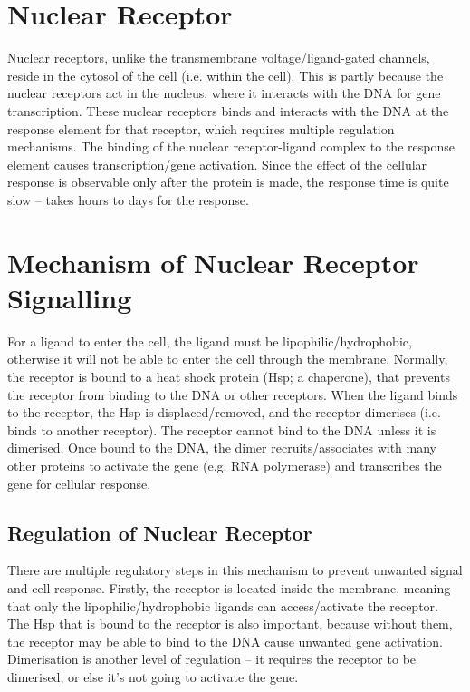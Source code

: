 \section{Nuclear Receptor}

Nuclear receptors, unlike the transmembrane voltage/ligand-gated channels, reside in the cytosol of the cell (i.e. within the cell).
This is partly because the nuclear receptors act in the nucleus, where it interacts with the DNA for gene transcription.
These nuclear receptors binds and interacts with the DNA at the response element for that receptor, which requires multiple regulation mechanisms.
The binding of the nuclear receptor-ligand complex to the response element causes transcription/gene activation.
Since the effect of the cellular response is observable only after the protein is made, the response time is quite slow -- takes hours to days for the response.

\section{Mechanism of Nuclear Receptor Signalling}

For a ligand to enter the cell, the ligand must be lipophilic/hydrophobic, otherwise it will not be able to enter the cell through the membrane.
Normally, the receptor is bound to a heat shock protein (Hsp; a chaperone), that prevents the receptor from binding to the DNA or other receptors.
When the ligand binds to the receptor, the Hsp is displaced/removed, and the receptor dimerises (i.e. binds to another receptor).
The receptor cannot bind to the DNA unless it is dimerised.
Once bound to the DNA, the dimer recruits/associates with many other proteins to activate the gene (e.g. RNA polymerase) and transcribes the gene for cellular response.

\subsection{Regulation of Nuclear Receptor}

There are multiple regulatory steps in this mechanism to prevent unwanted signal and cell response.
Firstly, the receptor is located inside the membrane, meaning that only the lipophilic/hydrophobic ligands can access/activate the receptor.
The Hsp that is bound to the receptor is also important, because without them, the receptor may be able to bind to the DNA cause unwanted gene activation.
Dimerisation is another level of regulation -- it requires the receptor to be dimerised, or else it's not going to activate the gene.

